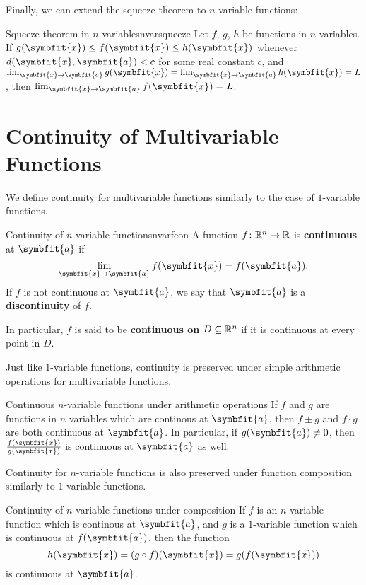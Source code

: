 \documentclass[math]{amznotes}
\theoremstyle{remark}
\begin{document}
Finally, we can extend the squeeze theorem to $n$-variable functions:
\begin{thmbox}{Squeeze theorem in $n$ variables}{nvarsqueeze}
    Let $f$, $g$, $h$ be functions in $n$ variables. If $g(\symbfit{x}) \leq f(\symbfit{x}) \leq h(\symbfit{x})$ whenever $d(\symbfit{x}, \symbfit{a}) < c$ for some real constant $c$, and $\lim_{\symbfit{x} \to \symbfit{a}}g(\symbfit{x}) = \lim_{\symbfit{x} \to \symbfit{a}}h(\symbfit{x}) = L$, then $\lim_{\symbfit{x} \to \symbfit{a}}f(\symbfit{x}) = L$.
\end{thmbox}
\section{Continuity of Multivariable Functions}
We define continuity for multivariable functions similarly to the case of $1$-variable functions.
\begin{dfnbox}{Continuity of $n$-variable functions}{nvarfcon}
    A function $f \colon \mathbb{R}^n \to \mathbb{R}$ is {\color{red} \textbf{continuous}} at $\symbfit{a}$ if
    \begin{equation*}
        \lim_{\symbfit{x} \to \symbfit{a}} f(\symbfit{x}) = f(\symbfit{a}).
    \end{equation*}
    If $f$ is not continuous at $\symbfit{a}$, we say that $\symbfit{a}$ is a {\color{red} \textbf{discontinuity}} of $f$.

    In particular, $f$ is said to be {\color{red} \textbf{continuous on}} $D \subseteq \mathbb{R}^n$ if it is continuous at every point in $D$.
\end{dfnbox}
Just like $1$-variable functions, continuity is preserved under simple arithmetic operations for multivariable functions.
\begin{thmbox}{Continuous $n$-variable functions under arithmetic operations}{}
    If $f$ and $g$ are functions in $n$ variables which are continous at $\symbfit{a}$, then $f \pm g$ and $f \cdot g$ are both continuous at $\symbfit{a}$. In particular, if $g(\symbfit{a}) \neq 0$, then $\frac{f(\symbfit{x})}{g(\symbfit{x})}$ is continuous at $\symbfit{a}$ as well.
\end{thmbox}
Continuity for $n$-variable functions is also preserved under function composition similarly to $1$-variable functions.
\begin{thmbox}{Continuity of $n$-variable functions under composition}{}
    If $f$ is an $n$-variable function which is continous at $\symbfit{a}$, and $g$ is a $1$-variable function which is continuous at $f(\symbfit{a})$, then the function
    \begin{displaymath}
        h(\symbfit{x}) = (g \circ f)(\symbfit{x}) = g(f(\symbfit{x}))
    \end{displaymath}
    is continuous at $\symbfit{a}$.
\end{thmbox}
\end{document}

